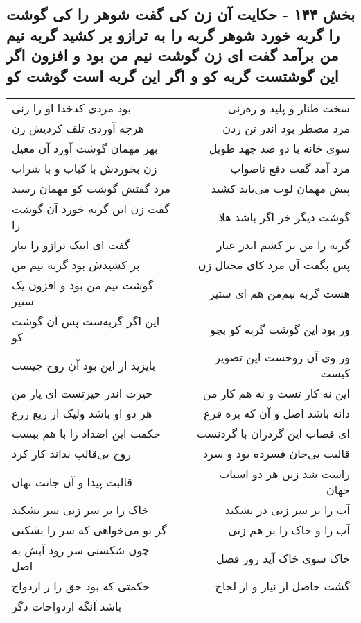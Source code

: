 \begin{center}
\section*{بخش ۱۴۴ - حکایت آن زن کی گفت شوهر را کی گوشت را گربه خورد شوهر گربه را به ترازو بر کشید گربه نیم من برآمد گفت ای زن گوشت نیم من بود و افزون اگر این گوشتست گربه کو و اگر این گربه است گوشت کو}
\label{sec:sh144}
\begin{longtable}{l p{0.5cm} r}
بود مردی کدخدا او را زنی
&&
سخت طناز و پلید و ره‌زنی
\\
هرچه آوردی تلف کردیش زن
&&
مرد مضطر بود اندر تن زدن
\\
بهر مهمان گوشت آورد آن معیل
&&
سوی خانه با دو صد جهد طویل
\\
زن بخوردش با کباب و با شراب
&&
مرد آمد گفت دفع ناصواب
\\
مرد گفتش گوشت کو مهمان رسید
&&
پیش مهمان لوت می‌باید کشید
\\
گفت زن این گربه خورد آن گوشت را
&&
گوشت دیگر خر اگر باشد هلا
\\
گفت ای ایبک ترازو را بیار
&&
گربه را من بر کشم اندر عیار
\\
بر کشیدش بود گربه نیم من
&&
پس بگفت آن مرد کای محتال زن
\\
گوشت نیم من بود و افزون یک ستیر
&&
هست گربه نیم‌من هم ای ستیر
\\
این اگر گربه‌ست پس آن گوشت کو
&&
ور بود این گوشت گربه کو بجو
\\
بایزید ار این بود آن روح چیست
&&
ور وی آن روحست این تصویر کیست
\\
حیرت اندر حیرتست ای یار من
&&
این نه کار تست و نه هم کار من
\\
هر دو او باشد ولیک از ریع زرع
&&
دانه باشد اصل و آن که پره فرع
\\
حکمت این اضداد را با هم ببست
&&
ای قصاب این گردران با گردنست
\\
روح بی‌قالب نداند کار کرد
&&
قالبت بی‌جان فسرده بود و سرد
\\
قالبت پیدا و آن جانت نهان
&&
راست شد زین هر دو اسباب جهان
\\
خاک را بر سر زنی سر نشکند
&&
آب را بر سر زنی در نشکند
\\
گر تو می‌خواهی که سر را بشکنی
&&
آب را و خاک را بر هم زنی
\\
چون شکستی سر رود آبش به اصل
&&
خاک سوی خاک آید روز فصل
\\
حکمتی که بود حق را ز ازدواج
&&
گشت حاصل از نیاز و از لجاج
\\
باشد آنگه ازدواجات دگر

\end{longtable}
\end{center}
